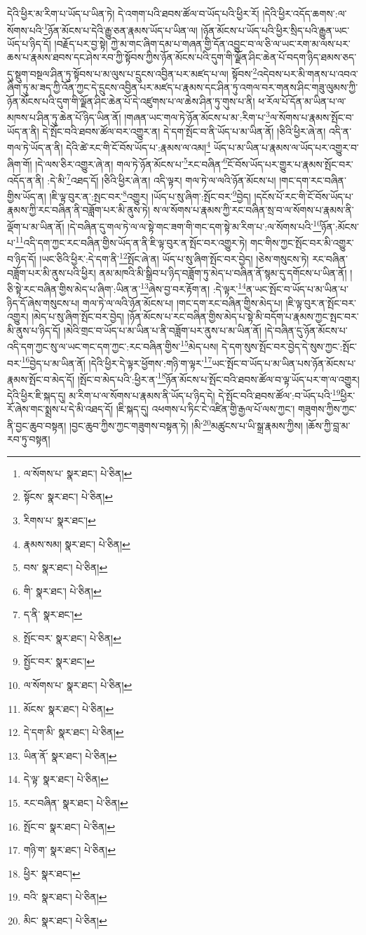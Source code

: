 དེའི་ཕྱིར་མ་རིག་པ་ཡོད་པ་ཡིན་ཏེ། དེ་འགག་པའི་ཐབས་ཚོལ་བ་ཡོད་པའི་ཕྱིར་རོ། །དེའི་ཕྱིར་འདོད་ཆགས་:ལ་སོགས་པའི་\footnote{ལ་སོགས་པ་  སྣར་ཐང་།  པེ་ཅིན། }ཉོན་མོངས་པ་དེའི་རྒྱུ་ཅན་རྣམས་ཡོད་པ་ཡིན་ལ། །ཉོན་མོངས་པ་ཡོད་པའི་ཕྱིར་སྲིད་པའི་རྒྱུན་ཡང་ཡོད་པ་ཉིད་དོ། །བརྗོད་པར་བྱ་སྟེ། ཀྱེ་མ་གང་ཞིག་དམ་པ་གཞན་གྱི་དོན་འབྱུང་བ་ལ་ཅི་ལ་ཡང་རག་མ་ལས་པར་ཆས་པ་རྣམས་ཐབས་དང་ཤེས་རབ་ཀྱི་སྟོབས་ཀྱིས་ཉོན་མོངས་པའི་དུག་གི་ལྗོན་ཤིང་ཆེན་པོ་བདག་ཉིད་ཐམས་ཅད་དུ་སྡུག་བསྔལ་ཤིན་ཏུ་སྟོབས་པ་མ་ལུས་པ་དྲུངས་འབྱིན་པར་མཛད་པ་ལ། སྟོབས་\footnote{སྟོངས་  སྣར་ཐང་།  པེ་ཅིན། }འདེབས་པར་མི་གནས་པ་འབའ་ཞིག་ཏུ་མ་ཟད་ཀྱི་འོན་ཀྱང་དེ་དྲུངས་འབྱིན་པར་མཛད་པ་རྣམས་དང་ཤིན་ཏུ་འགལ་བར་གནས་ཤིང་གཟུ་ལུམས་ཀྱི་ཉོན་མོངས་པའི་དུག་གི་ལྗོན་ཤིང་ཆེན་པོ་དེ་འཛུགས་པ་ལ་ཆེས་ཤིན་ཏུ་གུས་པ་ནི། ཕ་རོལ་པོ་དོན་མ་ཡིན་པ་ལ་མཁས་པ་ཤིན་ཏུ་ཆེན་པོ་ཉིད་ཡིན་ནོ། །གཞན་ཡང་གལ་ཏེ་ཉོན་མོངས་པ་མ་:རིག་པ་\footnote{རིགས་པ་  སྣར་ཐང་། }ལ་སོགས་པ་རྣམས་སྤོང་བ་ཡོད་ན་ནི། དེ་སྤོང་བའི་ཐབས་ཚོལ་བར་འགྱུར་ན། དེ་དག་སྤོང་བ་ནི་ཡོད་པ་མ་ཡིན་ནོ། །ཅིའི་ཕྱིར་ཞེ་ན། འདི་ན་གལ་ཏེ་ཡོད་ན་ནི། དེའི་ཚེ་རང་གི་ངོ་བོས་ཡོད་པ་:རྣམས་ལ་འམ།\footnote{རྣམས་སམ།  སྣར་ཐང་།  པེ་ཅིན། } ཡོད་པ་མ་ཡིན་པ་རྣམས་ལ་ཡོད་པར་འགྱུར་བ་ཞིག་གོ། །དེ་ལས་ཅིར་འགྱུར་ཞེ་ན། གལ་ཏེ་ཉོན་མོངས་པ་\footnote{བས་  སྣར་ཐང་།  པེ་ཅིན། }རང་བཞིན་\footnote{གི་  སྣར་ཐང་།  པེ་ཅིན། }ངོ་བོས་ཡོད་པར་གྱུར་པ་རྣམས་སྤོང་བར་འདོད་ན་ནི། :དེ་མི་\footnote{ད་ནི་  སྣར་ཐང་། }འཐད་དོ། །ཅིའི་ཕྱིར་ཞེ་ན། འདི་ལྟར། གལ་ཏེ་ལ་ལའི་ཉོན་མོངས་པ། །གང་དག་རང་བཞིན་གྱིས་ཡོད་ན། །ཇི་ལྟ་བུར་ན་:སྤང་བར་\footnote{སྤོང་བར་  སྣར་ཐང་།  པེ་ཅིན། }འགྱུར། །ཡོད་པ་སུ་ཞིག་:སྤོང་བར་\footnote{སྤྱོང་བར་  སྣར་ཐང་། }བྱེད། །དངོས་པོ་རང་གི་ངོ་བོས་ཡོད་པ་རྣམས་ཀྱི་རང་བཞིན་ནི་བཟློག་པར་མི་ནུས་ཏེ། ས་ལ་སོགས་པ་རྣམས་ཀྱི་རང་བཞིན་སྲ་བ་ལ་སོགས་པ་རྣམས་ནི་ལྡོག་པ་མ་ཡིན་ནོ། །དེ་བཞིན་དུ་གལ་ཏེ་ལ་ལ་སྟེ་གང་ཟག་གི་གང་དག་སྟེ་མ་རིག་པ་:ལ་སོགས་པའི་\footnote{ལ་སོགས་པ་  སྣར་ཐང་།  པེ་ཅིན། }ཉོན་:མོངས་པ་\footnote{མོངས་  སྣར་ཐང་།  པེ་ཅིན། }འདི་དག་ཀྱང་རང་བཞིན་གྱིས་ཡོད་ན་ནི་ཇི་ལྟ་བུར་ན་སྤོང་བར་འགྱུར་ཏེ། གང་གིས་ཀྱང་སྤོང་བར་མི་འགྱུར་བ་ཉིད་དོ། །ཡང་ཅིའི་ཕྱིར་:དེ་དག་ནི་\footnote{དེ་དག་མི་  སྣར་ཐང་།  པེ་ཅིན། }སྤོང་ཞེ་ན། ཡོད་པ་སུ་ཞིག་སྤོང་བར་བྱེད། །ཅེས་གསུངས་ཏེ། རང་བཞིན་བཟློག་པར་མི་ནུས་པའི་ཕྱིར། ནམ་མཁའི་མི་སྒྲིབ་པ་ཉིད་བཟློག་ཏུ་མེད་པ་བཞིན་ནོ་སྙམ་དུ་དགོངས་པ་ཡིན་ནོ། །ཅི་སྟེ་རང་བཞིན་གྱིས་མེད་པ་ཞིག་:ཡིན་ན་\footnote{ཡིན་ནོ་  སྣར་ཐང་།  པེ་ཅིན། }ཞེས་བྱ་བར་རྟོག་ན། :དེ་ལྟར་\footnote{དེ་ལྟ་  སྣར་ཐང་།  པེ་ཅིན། }ན་ཡང་སྤོང་བ་ཡོད་པ་མ་ཡིན་པ་ཉིད་དོ་ཞེས་གསུངས་པ། གལ་ཏེ་ལ་ལའི་ཉོན་མོངས་པ། །གང་དག་རང་བཞིན་གྱིས་མེད་པ། །ཇི་ལྟ་བུར་ན་སྤོང་བར་འགྱུར། །མེད་པ་སུ་ཞིག་སྤོང་བར་བྱེད། །ཉོན་མོངས་པ་རང་བཞིན་གྱིས་མེད་པ་སྟེ་མི་བདོག་པ་རྣམས་ཀྱང་སྤང་བར་མི་ནུས་པ་ཉིད་དོ། །མེའི་གྲང་བ་ཡོད་པ་མ་ཡིན་པ་ནི་བཟློག་པར་ནུས་པ་མ་ཡིན་ནོ། །དེ་བཞིན་དུ་ཉོན་མོངས་པ་འདི་དག་ཀྱང་སུ་ལ་ཡང་གང་དག་ཀྱང་:རང་བཞིན་གྱིས་\footnote{རང་བཞིན་  སྣར་ཐང་།  པེ་ཅིན། }མེད་པས། དེ་དག་སུས་སྤོང་བར་བྱེད་དེ་སུས་ཀྱང་:སྤོང་བར་\footnote{སྤོང་བ་  སྣར་ཐང་།  པེ་ཅིན། }བྱེད་པ་མ་ཡིན་ནོ། །དེའི་ཕྱིར་དེ་ལྟར་ཕྱོགས་:གཉི་ག་ལྟར་\footnote{གཉི་ག་  སྣར་ཐང་།  པེ་ཅིན། }ཡང་སྤོང་བ་ཡོད་པ་མ་ཡིན་པས་ཉོན་མོངས་པ་རྣམས་སྤོང་བ་མེད་དོ། །སྤོང་བ་མེད་པའི་:ཕྱིར་ན་\footnote{ཕྱིར་  སྣར་ཐང་། }ཉོན་མོངས་པ་སྤོང་བའི་ཐབས་ཚོལ་བ་ལྟ་ཡོད་པར་ག་ལ་འགྱུར། དེའི་ཕྱིར་ཇི་སྐད་དུ། མ་རིག་པ་ལ་སོགས་པ་རྣམས་ནི་ཡོད་པ་ཉིད་དེ། དེ་སྤོང་བའི་ཐབས་ཚོལ་:བ་ཡོད་པའི་\footnote{བའི་  སྣར་ཐང་།  པེ་ཅིན། }ཕྱིར་རོ་ཞེས་གང་སྨྲས་པ་དེ་མི་འཐད་དོ། །ཇི་སྐད་དུ། འཕགས་པ་ཏིང་ངེ་འཛིན་གྱི་རྒྱལ་པོ་ལས་ཀྱང་། གཟུགས་ཀྱིས་ཀྱང་ནི་བྱང་ཆུབ་བསྟན། །བྱང་ཆུབ་ཀྱིས་ཀྱང་གཟུགས་བསྟན་ཏེ། །མི་\footnote{མིང་  སྣར་ཐང་།  པེ་ཅིན། }མཚུངས་པ་ཡི་སྒྲ་རྣམས་ཀྱིས། །ཆོས་ཀྱི་བླ་མ་རབ་ཏུ་བསྟན། 